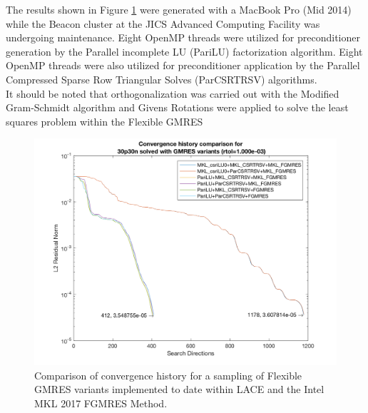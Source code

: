 \documentclass[12pt,portrait]{article}
\begin{document}
The results shown in Figure \ref{fig:30p30n_convergence} were generated with a MacBook Pro (Mid 2014) while the Beacon cluster at the JICS 
Advanced Computing Facility was undergoing maintenance. 
Eight OpenMP threads were utilized for preconditioner generation by the Parallel incomplete LU 
(PariLU) factorization algorithm. 
Eight OpenMP threads were also utilized for preconditioner application by the Parallel Compressed 
Sparse Row Triangular Solves (ParCSRTRSV) algorithms.
\\
It should be noted that orthogonalization was carried out with the Modified Gram-Schmidt algorithm and Givens Rotations were applied to solve the least squares problem within the Flexible GMRES

\begin{figure}[ht]\centering
  \includegraphics[width=0.95\columnwidth]{../images/30p30n_compare_GMRES_convergence_hist.png}
  \caption{Comparison of convergence history for a sampling of Flexible GMRES variants implemented to date within LACE and the Intel MKL 2017 FGMRES Method.}
  \vspace{-10pt}
  \label{fig:30p30n_convergence}
\end{figure}
\end{document}
